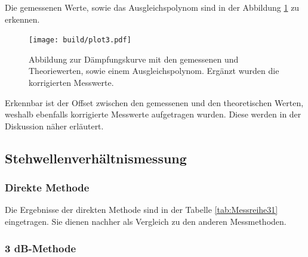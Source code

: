 Die gemessenen Werte, sowie das Ausgleichspolynom sind in der Abbildung \ref{111} zu erkennen.
\begin{figure}
    \centering
    \texttt{[image: build/plot3.pdf]}
    \caption{Abbildung zur Dämpfungskurve mit den gemessenen und Theoriewerten, sowie einem Ausgleichspolynom. Ergänzt wurden die korrigierten Messwerte.} 
    \label{111}
\end{figure}
Erkennbar ist der Offset zwischen den gemessenen und den theoretischen Werten, weshalb ebenfalls korrigierte Messwerte aufgetragen wurden. Diese werden in der Diskussion näher
erläutert.

\subsection{Stehwellenverhältnismessung}

\subsubsection{Direkte Methode}
Die Ergebnisse der direkten Methode sind in der Tabelle \ref{tab:Messreihe31} eingetragen. Sie dienen nachher als Vergleich zu den anderen Messmethoden.

\subsubsection{3 dB-Methode}


